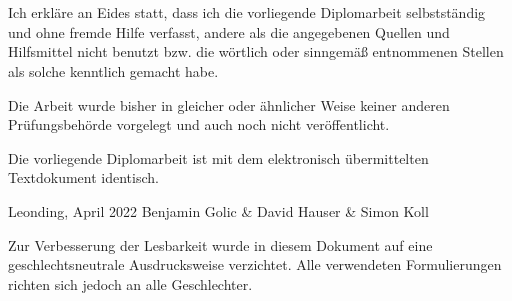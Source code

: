 \thispagestyle{empty}
\vspace{3cm}
~ \\ \\
Ich erkläre an Eides statt, dass ich die vorliegende Diplomarbeit selbstständig und ohne fremde Hilfe verfasst, andere als die angegebenen Quellen und Hilfsmittel nicht benutzt bzw. die wörtlich oder sinngemäß entnommenen Stellen als solche kenntlich gemacht habe.

Die Arbeit wurde bisher in gleicher oder ähnlicher Weise keiner anderen Prüfungsbehörde vorgelegt und auch noch nicht veröffentlicht.

Die vorliegende Diplomarbeit ist mit dem elektronisch übermittelten Textdokument identisch.
\vspace{3cm}
\begin{tabbing}
Leonding, April 2022 \hspace{5cm} Benjamin Golic \& David Hauser \& Simon Koll
\end{tabbing}
\vspace{10cm}
Zur Verbesserung der Lesbarkeit wurde in diesem Dokument auf eine geschlechtsneutrale Ausdrucksweise verzichtet.
Alle verwendeten Formulierungen richten sich jedoch an alle Geschlechter.
\newpage
\setcounter{page}{1}
